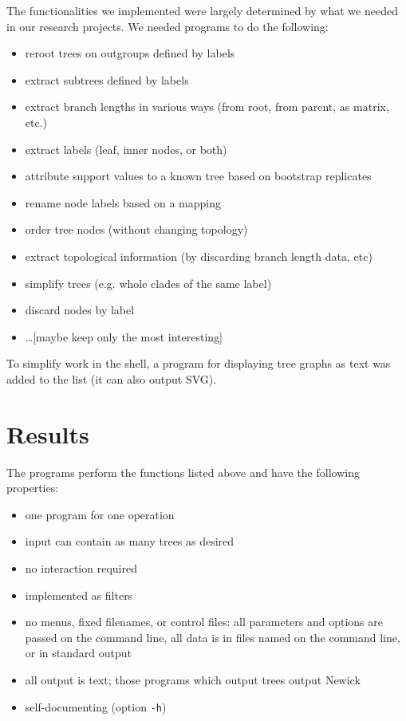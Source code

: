 \documentclass[a4paper,10pt]{article}
\begin{document}
The functionalities we implemented were largely determined by what we needed in our research projects. We needed programs to do the following:

\begin{itemize}
 \item reroot trees on outgroups defined by labels
 \item extract subtrees defined by labels
 \item extract branch lengths in various ways (from root, from parent, as matrix, etc.)
 \item extract labels (leaf, inner nodes, or both)
 \item attribute support values to a known tree based on bootstrap replicates
 \item rename node labels based on a mapping
 \item order tree nodes (without changing topology)
 \item extract topological information (by discarding branch length data, etc)
 \item simplify trees (e.g. whole clades of the same label)
 \item discard nodes by label
 \item \ldots [maybe keep only the most interesting]
\end{itemize}

To simplify work in the shell, a program for displaying tree graphs as text was added to the list (it can also output SVG).

\section{Results}

The programs perform the functions listed above and have the following properties:

\begin{itemize}
 \item one program for one operation
 \item input can contain as many trees as desired
 \item no interaction required
 \item implemented as filters
 \item no menus, fixed filenames, or control files: all parameters and options are passed on the command line, all data is in files named on the command line, or in standard output
 \item all output is text; those programs which output trees output Newick
 \item self-documenting (option \texttt{-h})
\end{itemize}
\end{document}
